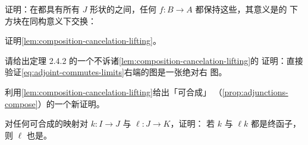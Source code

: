 \begin{exercise}\label{ex:preservation-commuting-squares}
证明：在都具有所有 $J$ 形状\trColimit{}的\trInfinityCategory{}之间，任何%
\trLeftAdjoint $f\colon B\to A$ 都保持这些\trColimit，其意义是\trFunctor{}的
下方块在同构意义下交换：
\begin{center}
\end{center}
\end{exercise}

\begin{exercise}\label{ex:prove-lemma-composition}
证明\cref{lem:composition-cancelation-lifting}。
\end{exercise}

\begin{exercise}\label{ex:gap-in-bogus-proof}
请给出定理 2.4.2 的一个不诉诸\cref{lem:composition-cancelation-lifting}的
证明：直接验证\cref{eq:adjoint-commutes-limits}右端的图是一张绝对右%
\trLifting{}图。
\end{exercise}

\begin{exercise}\label{ex:adjunctions-compose-new-proof}
利用\cref{lem:composition-cancelation-lifting}给出「\trAdjunction{}可合成」
（\cref{prop:adjunctions-compose}）的一个新证明。
\end{exercise}

\begin{exercise}\label{ex:final-functor-cancelation}
对任何可合成的映射对 $k\colon I\to J$ 与 $\ell\colon J\to K$，证明：
若 $k$ 与 $\ell k$ 都是终函子，则 $\ell$ 也是。
\end{exercise}
